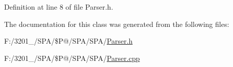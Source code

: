 Definition at line 8 of file Parser.\-h.



The documentation for this class was generated from the following files\-:\begin{DoxyCompactItemize}
\item 
F\-:/3201\-\_/\-S\-P\-A/\$\-P@/\-S\-P\-A/\-S\-P\-A/\hyperlink{_parser_8h}{Parser.\-h}\item 
F\-:/3201\-\_/\-S\-P\-A/\$\-P@/\-S\-P\-A/\-S\-P\-A/\hyperlink{_parser_8cpp}{Parser.\-cpp}\end{DoxyCompactItemize}
